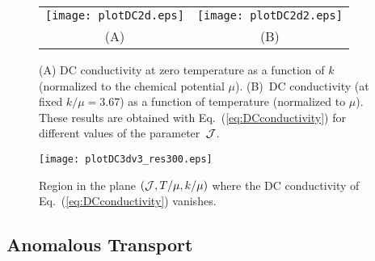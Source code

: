 \documentclass[a4paper]{jpconf}
\begin{document}
\begin{figure*}[htb]
\begin{tabular}{cc}
\texttt{[image: plotDC2d.eps]} &
\texttt{[image: plotDC2d2.eps]} \\
 (A)
    &
         (B)
\end{tabular}
\caption{(A) DC conductivity at zero temperature as a function of $k$ (normalized to the chemical potential $\mu$). (B)~DC conductivity (at fixed $k/\mu=3.67$) as a function of temperature (normalized to $\mu$). These results are obtained with Eq.~(\ref{eq:DCconductivity}) for different values of the parameter~${\cal J}$.}
\label{fig:DCconductivity}
\end{figure*}


\begin{figure}[htb]
\texttt{[image: plotDC3dv3\_res300.eps]}
\begin{minipage}{18pc}
\vspace{-3.5cm}\caption{Region in the plane $({\cal J},T/\mu,k/\mu)$ where the DC conductivity of Eq.~(\ref{eq:DCconductivity}) vanishes.}
\label{fig:DCconductivity3D}
\end{minipage}
\end{figure}



\subsection{Anomalous Transport}
\label{subsec:anomalous_massive_gravity}
\end{document}
